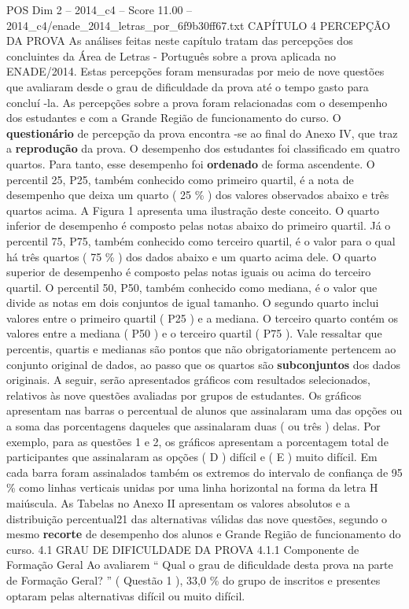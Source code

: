 \begin{textsample}{POS Dim 2 – 2014\_c4 – Score 11.00 – 2014\_c4/enade\_2014\_letras\_por\_6f9b30ff67.txt}  \label{ex:f2_pos_120}
CAPÍTULO 4 PERCEPÇÃO DA PROVA As análises feitas neste capítulo tratam das percepções dos concluintes da Área de Letras - Português sobre a prova aplicada no ENADE/2014.
Estas percepções foram mensuradas por meio de nove questões que avaliaram desde o grau de dificuldade da prova até o tempo gasto para concluí -la.
As percepções sobre a prova foram relacionadas com o desempenho dos estudantes e com a Grande Região de funcionamento do curso.
O \textbf{questionário} de percepção da prova encontra -se ao final do Anexo IV, que traz a \textbf{reprodução} da prova.
O desempenho dos estudantes foi classificado em quatro quartos.
Para tanto, esse desempenho foi \textbf{ordenado} de forma ascendente.
O percentil 25, P25, também conhecido como primeiro quartil, é a nota de desempenho que deixa um quarto ( 25 \% ) dos valores observados abaixo e três quartos acima.
A Figura 1 apresenta uma ilustração deste conceito.
O quarto inferior de desempenho é composto pelas notas abaixo do primeiro quartil.
Já o percentil 75, P75, também conhecido como terceiro quartil, é o valor para o qual há três quartos ( 75 \% ) dos dados abaixo e um quarto acima dele.
O quarto superior de desempenho é composto pelas notas iguais ou acima do terceiro quartil.
O percentil 50, P50, também conhecido como mediana, é o valor que divide as notas em dois conjuntos de igual tamanho.
O segundo quarto inclui valores entre o primeiro quartil ( P25 ) e a mediana.
O terceiro quarto contém os valores entre a mediana ( P50 ) e o terceiro quartil ( P75 ).
Vale ressaltar que percentis, quartis e medianas são pontos que não obrigatoriamente pertencem ao conjunto original de dados, ao passo que os quartos são \textbf{subconjuntos} dos dados originais.
A seguir, serão apresentados gráficos com resultados selecionados, relativos às nove questões avaliadas por grupos de estudantes.
Os gráficos apresentam nas barras o percentual de alunos que assinalaram uma das opções ou a soma das porcentagens daqueles que assinalaram duas ( ou três ) delas.
Por exemplo, para as questões 1 e 2, os gráficos apresentam a porcentagem total de participantes que assinalaram as opções ( D ) difícil e ( E ) muito difícil.
Em cada barra foram assinalados também os extremos do intervalo de confiança de 95 \% como linhas verticais unidas por uma linha horizontal na forma da letra H maiúscula.
As Tabelas no Anexo II apresentam os valores absolutos e a distribuição percentual21 das alternativas válidas das nove questões, segundo o mesmo \textbf{recorte} de desempenho dos alunos e Grande Região de funcionamento do curso. 4.1 GRAU DE DIFICULDADE DA PROVA 4.1.1 Componente de Formação Geral Ao avaliarem “ Qual o grau de dificuldade desta prova na parte de Formação Geral? ” ( Questão 1 ), 33,0 \% do grupo de inscritos e presentes optaram pelas alternativas difícil ou muito difícil.

\end{textsample}

